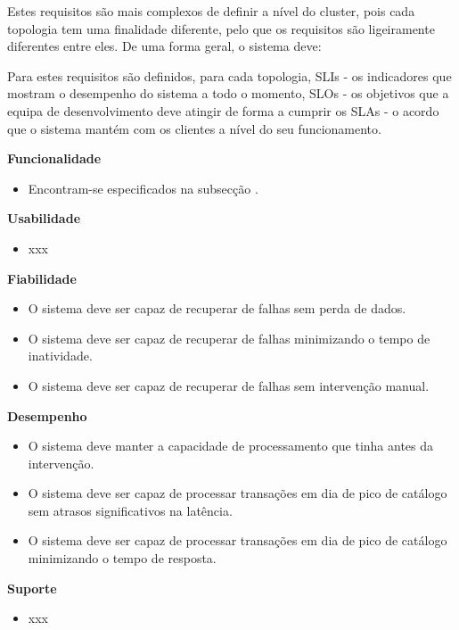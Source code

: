 Estes requisitos são mais complexos de definir a nível do \gls{cluster}, pois cada topologia tem 
uma finalidade diferente, pelo que os requisitos são ligeiramente diferentes entre eles. De uma
forma geral, o sistema deve:

Para estes requisitos são definidos, para cada topologia, \acp{SLI} - os indicadores que mostram o
desempenho do sistema a todo o momento, \acp{SLO} - os objetivos que a equipa de desenvolvimento
deve atingir de forma a cumprir os \acp{SLA} - o acordo que o sistema mantém com os clientes a 
nível do seu funcionamento.

\vspace{5mm}

\textbf{Funcionalidade}
\begin{itemize}
  \item Encontram-se especificados na subsecção .
\end{itemize}

\textbf{Usabilidade}
\begin{itemize}
  \item xxx
\end{itemize}

\textbf{Fiabilidade}

\begin{itemize}
  \item O sistema deve ser capaz de recuperar de falhas sem perda de dados.
  \item O sistema deve ser capaz de recuperar de falhas minimizando o tempo de inatividade.
  \item O sistema deve ser capaz de recuperar de falhas sem intervenção manual.
\end{itemize}


\textbf{Desempenho}
\begin{itemize}
  \item O sistema deve manter a capacidade de processamento que tinha antes da intervenção.
  \item O sistema deve ser capaz de processar transações em dia de pico de catálogo sem atrasos 
    significativos na latência.
  \item O sistema deve ser capaz de processar transações em dia de pico de catálogo minimizando o 
    tempo de resposta.
\end{itemize}

\textbf{Suporte}
\begin{itemize}
  \item xxx
\end{itemize}


